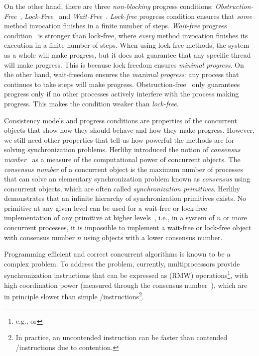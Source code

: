 On the other hand, there are three \textit{non-blocking} progress conditions: \textit{Obstruction-Free}~\cite{DBLP_conf_icdcs_HerlihyLM03}, \textit{Lock-Free}~\cite{DBLP_journals_toplas_HerlihyW90} and \textit{Wait-Free}~\cite{DBLP_journals_toplas_Herlihy91}.
\textit{Lock-free} progress condition ensures that \textit{some} method invocation finishes in a finite number of steps. \textit{Wait-free} progress condition~\cite{DBLP_journals_toplas_Herlihy91} is stronger than lock-free, where \textit{every} method invocation finishes its execution in a finite number of steps. When using lock-free methods, the system as a whole will make progress, but it does not guarantee that any specific thread will make progress. This is because lock freedom ensures \textit{minimal progress}. On the other hand, wait-freedom ensures the \textit{maximal progress}: any process that continues to take steps will make progress. Obstruction-free~\cite{DBLP_conf_icdcs_HerlihyLM03} only guarantees progress only if no other processes actively interfere with the process making progress. This makes the condition weaker than \textit{lock-free}. %

Consistency models and progress conditions are properties of the concurrent objects that show how they should behave and how they make progress. However, we still need other properties that tell us how powerful the methods are for solving synchronization problems. Herlihy introduced the notion of \textit{consensus number}~\cite{DBLP_journals_toplas_Herlihy91} as a measure of the computational power of concurrent objects. The \textit{consensus number} of a concurrent object is the maximum number of processes that can solve an elementary synchronization problem known as \textit{consensus} using concurrent objects, which are often called \textit{synchronization primitives}. Herlihy demonstrates that an infinite hierarchy of synchronization primitives exists. No primitive at any given level can be used for a wait-free or lock-free implementation of any primitive at higher levels~\cite{DBLP_journals_toplas_Herlihy91}, i.e., in a system of \(n\) or more concurrent processes, it is impossible to implement a wait-free or lock-free object with consensus number \(n\) using objects with a lower consensus number.

Programming efficient and correct concurrent algorithms is known to be a complex problem. To address the problem, currently, multiprocessors provide synchronization instructions that can be expressed as \RMW (RMW) operations\footnote{e.g., \CAS or \TAS}, with high coordination power (measured through the consensus number~\cite{DBLP_journals_toplas_Herlihy91}), which are in principle slower than simple \R/\W instructions\footnote{In practice, an uncontended \RMW instruction can be faster than contended \R/\W instructions due to contention.}.

